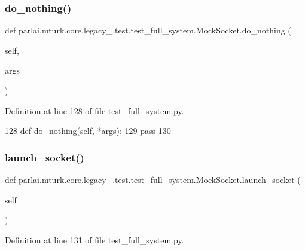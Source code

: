 \subsubsection{\texorpdfstring{do\+\_\+nothing()}{do\_nothing()}}
{\footnotesize\ttfamily def parlai.\+mturk.\+core.\+legacy\+\_.\+test.\+test\+\_\+full\+\_\+system.\+Mock\+Socket.\+do\+\_\+nothing (\begin{DoxyParamCaption}\item[{}]{self,  }\item[{}]{args }\end{DoxyParamCaption})}



Definition at line 128 of file test\+\_\+full\+\_\+system.\+py.


\begin{DoxyCode}
128     \textcolor{keyword}{def }do\_nothing(self, *args):
129         \textcolor{keywordflow}{pass}
130 
\end{DoxyCode}
\mbox{\label{classparlai_1_1mturk_1_1core_1_1legacy__2018_1_1test_1_1test__full__system_1_1MockSocket_aa112de240558ca7b11d5b5b61838b1eb}} 
\subsubsection{\texorpdfstring{launch\+\_\+socket()}{launch\_socket()}}
{\footnotesize\ttfamily def parlai.\+mturk.\+core.\+legacy\+\_.\+test.\+test\+\_\+full\+\_\+system.\+Mock\+Socket.\+launch\+\_\+socket (\begin{DoxyParamCaption}\item[{}]{self }\end{DoxyParamCaption})}



Definition at line 131 of file test\+\_\+full\+\_\+system.\+py.


